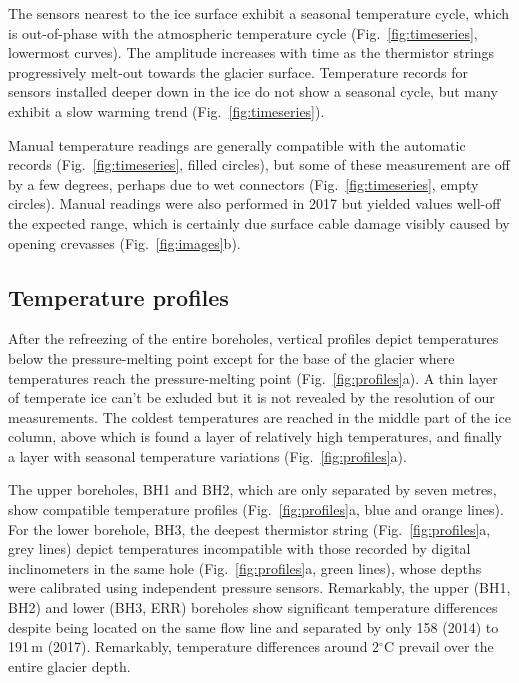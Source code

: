\documentclass[utf8]{article}
\begin{document}
    The sensors nearest to the ice surface exhibit a seasonal temperature
    cycle, which is out-of-phase with the atmospheric temperature cycle
    (Fig.~\ref{fig:timeseries}, lowermost curves). The
    amplitude increases with time as the thermistor strings progressively
    melt-out towards the glacier surface. Temperature records for sensors
    installed deeper
    down in the ice do not show a seasonal cycle, but many exhibit a slow
    warming trend (Fig.~\ref{fig:timeseries}).

    Manual temperature readings are generally compatible with the automatic
    records (Fig.~\ref{fig:timeseries}, filled circles), but some of these
    measurement are off by a few degrees, perhaps due to wet connectors
    (Fig.~\ref{fig:timeseries}, empty circles). Manual readings were also
    performed in 2017 but yielded values well-off the expected range, which
    is certainly due surface cable damage visibly caused by opening crevasses
    (Fig.~\ref{fig:images}b).


\subsection{Temperature profiles}

    After the refreezing of the entire boreholes, vertical profiles depict
    temperatures below the pressure-melting point except for the base of the
    glacier where temperatures reach the pressure-melting point
    (Fig.~\ref{fig:profiles}a). A thin layer of temperate ice can't be exluded
    but it is not revealed by the resolution of our measurements. The coldest
    temperatures are reached in the middle part of the ice column, above which
    is found a layer of relatively high temperatures, and finally a layer with
    seasonal temperature variations (Fig.~\ref{fig:profiles}a).

    The upper boreholes, BH1 and BH2, which are only separated by seven metres,
    show compatible temperature profiles (Fig.~\ref{fig:profiles}a, blue and
    orange lines). For the lower borehole, BH3, the deepest thermistor string
    (Fig.~\ref{fig:profiles}a, grey lines) depict temperatures incompatible
    with those recorded by digital inclinometers in the same hole
    (Fig.~\ref{fig:profiles}a, green lines), whose depths were calibrated
    using independent pressure sensors.
    Remarkably, the upper (BH1, BH2) and lower (BH3, ERR) boreholes show
    significant temperature differences despite being located on the same
    flow line and separated by only 158 (2014) to 191\,m (2017). Remarkably,
    temperature differences
    around 2$^\circ$C prevail over the entire glacier depth.
\end{document}
